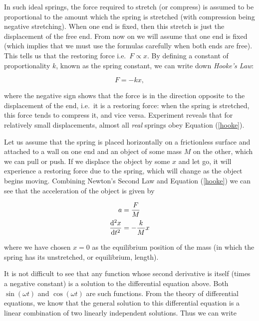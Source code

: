 \begin{refsection}
In such ideal springs, the force required to stretch (or compress) is assumed to be proportional to the amount which the spring is stretched (with compression being negative stretching). When one end is fixed, then this stretch is just the displacement of the free end. From now on we will assume that one end is fixed (which implies that we must use the formulas carefully when both ends are free). This tells us that the restoring force i.e.\ $F \propto x$. By defining a constant of proportionality $k$, known as the spring constant, we can write down \textit{Hooke's Law}:

\begin{equation}
    F = - k x,
    \label{hooke}
\end{equation}

where the negative sign shows that the force is in the direction opposite to the displacement of the end, i.e.\ it is a restoring force: when the spring is stretched, this force tends to compress it, and vice versa. Experiment reveals that for relatively small displacements, almost all \textit{real} springs obey Equation (\ref{hooke}).

Let us assume that the spring is placed horizontally on a frictionless surface and attached to a wall on one end and an object of some mass $M$ on the other, which we can pull or push. If we displace the object by some $x$ and let go, it will experience a restoring force due to the spring, which will change as the object begins moving. Combining Newton's Second Law and Equation (\ref{hooke}) we can see that the acceleration of the object is given by

\begin{equation}
\begin{aligned}
    a &= \frac{F}{M} \\
    \dv[2]{x}{t}&=-\frac{k}{M} x
\end{aligned}
\label{diffEqnSimpleSpring}
\end{equation}

where we have chosen $x = 0$ as the equilibrium position of the mass (in which the spring has its unstretched, or equilibrium, length).


It is not difficult to see that any function whose second derivative is itself (times a negative constant) is a solution to the differential equation above. Both $\sin (\omega t)$ and $\cos (\omega t)$ are such functions. From the theory of differential equations, we know that the general solution to this differential equation is a linear combination of two linearly independent solutions. Thus we can write


\end{refsection}
